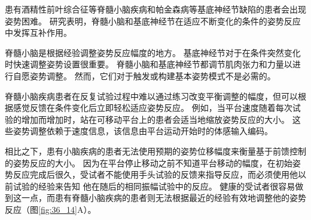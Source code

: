 患有酒精性前叶综合征等脊髓小脑疾病和帕金森病等基底神经节缺陷的患者会出现姿势困难。
研究表明，脊髓小脑和基底神经节在适应不断变化的条件的姿势反应中发挥互补作用。


脊髓小脑是根据经验调整姿势反应幅度的地方。
基底神经节对于在条件突然变化时快速调整姿势设置很重要。
脊髓小脑和基底神经节都调节肌肉张力和力量以进行自愿姿势调整。
然而，它们对于触发或构建基本姿势模式不是必需的。


脊髓小脑疾病患者在反复试验过程中难以通过练习改变平衡调整的幅度，但可以根据感觉反馈在条件变化后立即轻松适应姿势反应。
例如，当平台速度随着每次试验的增加而增加时，站在可移动平台上的患者会适当地缩放姿势反应的大小。
这些姿势调整依赖于速度信息，该信息由平台运动开始时的体感输入编码。


相比之下，患有小脑疾病的患者无法使用预期的姿势位移幅度来衡量基于前馈控制的姿势反应的大小。
因为在平台停止移动之前不知道平台移动的幅度，在初始姿势反应完成后很久，受试者不能使用手头试验的反馈来指导反应，而必须使用他以前试验的经验来告知 他在随后的相同振幅试验中的反应。
健康的受试者很容易做到这一点，而患有脊髓小脑疾病的患者则无法根据最近的经验有效地调整他的姿势反应（图\ref{fig:36_14}A）。


